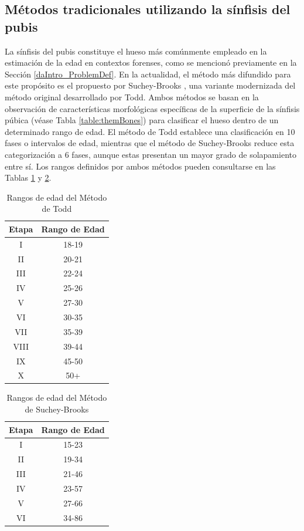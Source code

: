 \subsection{Métodos tradicionales utilizando la sínfisis del pubis}

La sínfisis del pubis constituye el hueso más comúnmente empleado en la estimación de la edad en contextos forenses, como se mencionó previamente en la Sección \ref{daIntro_ProblemDef}. En la actualidad, el método más difundido para este propósito es el propuesto por Suchey-Brooks \cite{RefWorks:RefID:20-brooks1990skeletal}, una variante modernizada del método original desarrollado por Todd. Ambos métodos se basan en la observación de características morfológicas específicas de la superficie de la sínfisis púbica (véase Tabla \ref{table:themBones}) para clasificar el hueso dentro de un determinado rango de edad. El método de Todd establece una clasificación en 10 fases o intervalos de edad, mientras que el método de Suchey-Brooks reduce esta categorización a 6 fases, aunque estas presentan un mayor grado de solapamiento entre sí. Los rangos definidos por ambos métodos pueden consultarse en las Tablas \ref{table:age_todd_} y \ref{table:age_suchey_brooks}.

\begin{table}[h]
\centering
\begin{tabular}{|c|c|}
    \hline
    \rowcolor[HTML]{D33333} 
    {\color[HTML]{FFFFFF} \textbf{Etapa}} & {\color[HTML]{FFFFFF} \textbf{Rango de Edad}} \\ \hline
    I & 18-19 \\ \hline
    II & 20-21 \\ \hline
    III & 22-24 \\ \hline
    IV & 25-26 \\ \hline
    V & 27-30 \\ \hline
    VI & 30-35 \\ \hline
    VII & 35-39 \\ \hline
    VIII & 39-44 \\ \hline
    IX & 45-50 \\ \hline
    X & 50+ \\ \hline
\end{tabular}
\caption{Rangos de edad del Método de Todd}
\label{table:age_todd_}
\end{table}

\begin{table}[h]
\centering
\begin{tabular}{|c|c|}
    \hline
    \rowcolor[HTML]{D33333} 
    {\color[HTML]{FFFFFF} \textbf{Etapa}} & {\color[HTML]{FFFFFF} \textbf{Rango de Edad}} \\ \hline
    I & 15-23 \\ \hline
    II & 19-34 \\ \hline
    III & 21-46 \\ \hline
    IV & 23-57 \\ \hline
    V & 27-66 \\ \hline
    VI & 34-86 \\ \hline
\end{tabular}
\caption{Rangos de edad del Método de Suchey-Brooks}
\label{table:age_suchey_brooks}
\end{table}

